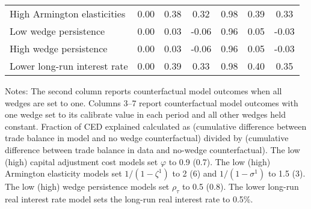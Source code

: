 \begin{table}[p]
\begin{center}
\begin{threeparttable}
\begin{tabular}{lcccccc}
High Armington elasticities& 0.00 & 0.38 & 0.32 & 0.98 & 0.39 & 0.33\\
Low wedge persistence& 0.00 & 0.03 & -0.06 & 0.96 & 0.05 & -0.03\\
High wedge persistence& 0.00 & 0.03 & -0.06 & 0.96 & 0.05 & -0.03\\
Lower long-run interest rate& 0.00 & 0.39 & 0.33 & 0.98 & 0.40 & 0.35\\
\bottomrule
\end{tabular}
\begin{tablenotes}
\item Notes: The second column reports counterfactual model outcomes when all wedges are set to one. Columns 3--7 report counterfactual model outcomes with one wedge set to its calibrate value in each period and all other wedges held constant. Fraction of CED explained calculated as (cumulative difference between trade balance in model and no wedge counterfactual) divided by (cumulative difference between trade balance in data and no-wedge counterfactual). The low (high) capital adjustment cost models set $\varphi$ to 0.9 (0.7). The low (high) Armington elasticity models set $1/(1-\zeta^1)$ to 2 (6) and $1/(1-\sigma^1)$ to 1.5 (3). The low (high) wedge persistence models set $\rho_\tau$ to 0.5 (0.8). The lower long-run real interest rate model sets the long-run real interest rate to 0.5\%.\end{tablenotes}
\end{threeparttable}
\end{center}
\normalsize
\end{table}
